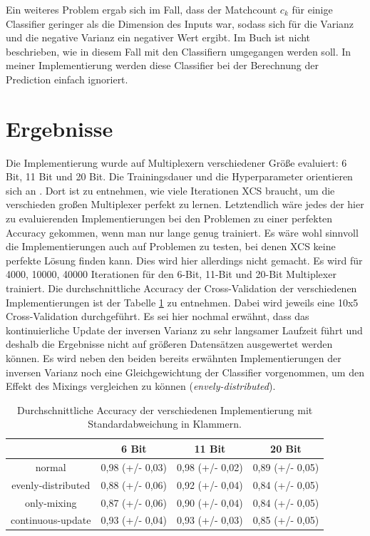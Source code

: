 \documentclass[10pt]{ocsmnar}
\begin{document}
Ein weiteres Problem ergab sich im Fall, dass der Matchcount $c_k$ für einige Classifier geringer als die Dimension des Inputs war, sodass sich für die Varianz und die negative Varianz ein negativer Wert ergibt. Im Buch ist nicht beschrieben, wie in diesem Fall mit den Classifiern umgegangen werden soll. In meiner Implementierung werden diese Classifier bei der Berechnung der Prediction einfach ignoriert. 



\section{Ergebnisse}
Die Implementierung wurde auf Multiplexern verschiedener Größe evaluiert: 6 Bit, 11 Bit und 20 Bit. Die Trainingsdauer und die Hyperparameter orientieren sich an \cite{iqbal13}. Dort ist zu entnehmen, wie viele Iterationen XCS braucht, um die verschieden großen Multiplexer perfekt zu lernen. Letztendlich wäre jedes der hier zu evaluierenden Implementierungen bei den Problemen zu einer perfekten Accuracy gekommen, wenn man nur lange genug trainiert. Es wäre wohl sinnvoll die Implementierungen auch auf Problemen zu testen, bei denen XCS keine perfekte Lösung finden kann. Dies wird hier allerdings nicht gemacht. 
Es wird für 4000, 10000, 40000 Iterationen für den 6-Bit, 11-Bit und 20-Bit Multiplexer trainiert. 
Die durchschnittliche Accuracy der Cross\--Vali\-dation der verschiedenen Implementierungen ist der Tabelle \ref{accuracy-tabelle}
 zu entnehmen. Dabei wird jeweils eine 10x5 Cross-Va\-li\-da\-tion durchgeführt. Es sei hier nochmal erwähnt, dass das kontinuierliche Update der inversen Varianz zu sehr langsamer Laufzeit führt und deshalb die Ergebnisse nicht auf größeren Datensätzen ausgewertet werden können. 
Es wird neben den beiden bereits erwähnten Implementierungen der inversen Varianz noch eine Gleichgewichtung der Classifier vorgenommen, um den Effekt des Mixings vergleichen zu können (\textit{envely-distributed}).  

\begin{table}
    
\begin{center}
\begin{tabular}{|c|c|c|c|}
    \hline
    & 6 Bit & 11 Bit & 20 Bit \\
    \hline
    normal & 0,98 (+/- 0,03) & 0,98 (+/- 0,02) & 0,89 (+/- 0,05) \\
    \hline
    evenly-distributed & 0,88 (+/- 0,06) & 0,92 (+/- 0,04) & 0,84 (+/- 0,05) \\
    \hline
    only-mixing & 0,87 (+/- 0,06) & 0,90 (+/- 0,04) & 0,84 (+/- 0,05) \\
    \hline
    continuous-update & 0,93 (+/- 0,04) & 0,93 (+/- 0,03) & 0,85 (+/- 0,05) \\
    \hline
\end{tabular}
\end{center}
\caption{Durchschnittliche Accuracy der verschiedenen Implementierung mit Standardabweichung in Klammern. }\label{accuracy-tabelle}
\end{table}
\end{document}
